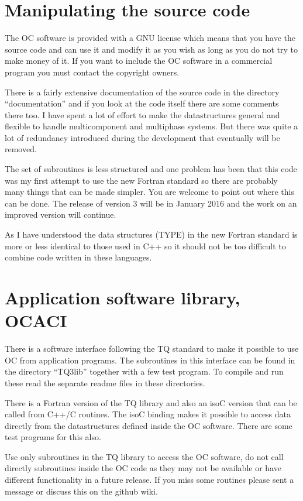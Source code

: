 \documentclass[12pt]{article}
\begin{document}
\section{Manipulating the source code}

The OC software is provided with a GNU license which means that you
have the source code and can use it and modify it as you wish as long
as you do not try to make money of it.  If you want to include the OC
software in a commercial program you must contact the copyright
owners.

There is a fairly extensive documentation of the source code in the
directory ``documentation'' and if you look at the code itself there
are some comments there too.  I have spent a lot of effort to make the
datastructures general and flexible to handle multicomponent and
multiphase systems.  But there was quite a lot of redundancy
introduced during the development that eventually will be removed.

The set of subroutines is less structured and one problem has been
that this code was my first attempt to use the new Fortran standard so
there are probably many things that can be made simpler.  You are
welcome to point out where this can be done.  The release of version 3
will be in January 2016 and the work on an improved version will
continue.

As I have understood the data structures (TYPE) in the new Fortran
standard is more or less identical to those used in C++ so it should
not be too difficult to combine code written in these languages.

\section{Application software library, OCACI}

There is a software interface following the TQ standard to make it
possible to use OC from application programs.  The subroutines in this
interface can be found in the directory ``TQ3lib'' together with a few
test program.  To compile and run these read the separate readme files
in these directories.

There is a Fortran version of the TQ library and also an isoC version
that can be called from C++/C routines.  The isoC binding makes it
possible to access data directly from the datastructures defined
inside the OC software.  There are some test programs for this also.

Use only subroutines in the TQ library to access the OC software, do
not call directly subroutines inside the OC code as they may not be
available or have different functionality in a future release.  If
you miss some routines please sent a message or discuss this on the
github wiki.
\end{document}
